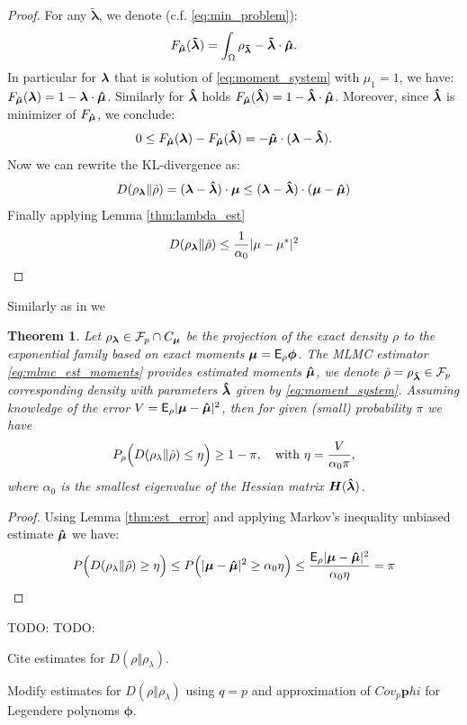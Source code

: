 \documentclass{article}
\newtheorem{theorem}{Theorem}[section]
\def\vc#1{\mathbf{\boldsymbol{#1}}}     %
\def\tn#1{\boldsymbol{#1}}
\def \E{{\mathsf E}}
\def\todo#1{{\color{red}TODO: #1}}
\def\abs#1{|#1|}
\begin{document}
\begin{proof}
\def\tvl{\vc{\tilde\lambda}}
For any $\tvl$, we denote (c.f. \eqref{eq:min_problem}):
\[
F_{\estvmu}(\tvl) = \int_{\Omega} \rho_{\tvl} - \tvl\cdot\estvmu.
\]
In particular for $\vl$ that is solution of \eqref{eq:moment_system} with $\mu_1 = 1$, we have:
$F_{\estvmu}(\vl) = 1 - \vl\cdot\estvmu$. Similarly for $\estvl$ holds
$F_{\estvmu}(\estvl) = 1 - \estvl\cdot\estvmu$. Moreover, since $\estvl$ is minimizer 
of $F_{\estvmu}$, we conclude:
\[
 0\le F_{\estvmu}(\vl) - F_{\estvmu}(\estvl) = - \estvmu\cdot(\vl - \estvl).
\]
Now we can rewrite the KL-divergence as:
\[
  D(\rho_{\vl}\Vert \estrho) = (\vl - \estvl)\cdot \vmu \le
  (\vl - \estvl)\cdot (\vmu - \estvmu)
\]
Finally applying Lemma \ref{thm:lambda_est}
\[
D(\rho_{\vl}\Vert \estrho) \le \frac{1}{\alpha_0} \abs{\mu - \mu^*}^2
\]
 
\end{proof}
Similarly as in \cite[Theorem 3]{Barron1991} we  
\begin{theorem}
  \label{eq:estimate_err_var}
  Let $\rho_{\vl} \in \mathcal F_p \cap C_{\vmu}$ be the projection of the exact density $\rho$ to the exponential family based on exact moments  $\vmu = \E_\rho \vphi$. The MLMC estimator \eqref{eq:mlmc_est_moments} provides estimated moments $\estvmu$, we denote $\estrho = \rho_{\estvl}\in \mathcal F_p$ corresponding density with parameters $\estvl$ given by \eqref{eq:moment_system}.
  Assuming knowledge of the error $V = \E_{\rho} |\vmu - \estvmu|^2$, then for given (small) probability $\pi$
  we have
  \[
      P_{\rho}\Big( D(\rho_{\lambda}\Vert \hat\rho) \le \eta\Big) \ge 1 - \pi,\quad 
      \text{with } \eta = \frac{V}{\alpha_0 \pi},
  \]
  where $\alpha_0$ is the smallest eigenvalue of the Hessian matrix $\tn H(\estvl)$.
  
\end{theorem}
\begin{proof}
  Using Lemma \ref{thm:est_error} and applying Markov's inequality unbiased estimate $\estvmu$ we have:
  \[
   P\Big( D(\rho_{\lambda}\Vert \estrho) \ge \eta\Big) 
   \le P\Big( \abs{\vmu - \estvmu}^2 \ge \alpha_0  \eta\Big)
   \le \frac{\E_{\rho} |\vmu - \estvmu|^2}{\alpha_0 \eta} = \pi
  \]
\end{proof}


\todo{TODO:}

Cite estimates for $D(\rho\Vert\rho_{\lambda})$.

Modify estimates for $D(\rho\Vert\rho_{\lambda})$ using $q=p$ and
approximation of $Cov_p \vc phi$ for Legendere polynoms $\vc\phi$.
\end{document}

